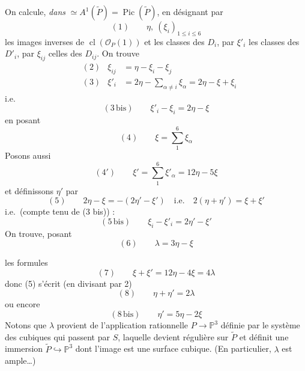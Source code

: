 \documentclass[11pt,a4paper]{article}
\begin{document}
On calcule, \emph{dans}  $\simeq A^1(\widetilde{P}) =
\operatorname{Pic}(\widetilde{P})$, en désignant par
\[
(1) \qquad \eta, \ (\xi_i)_{1 \leq i \leq 6}
\]
les images inverses de $\operatorname{cl}(\mathcal{O}_P(1))$ et les classes
des $D_i$, par $\xi'_i$ les classes des $D'_i$, par $\xi_{ij}$ celles des
$D_{ij}$. On trouve
\[
\begin{aligned}
&(2) & \xi_{ij} &= \eta - \xi_i - \xi_j \\
&(3) & \xi'_i &= 2\eta - \sum_{\alpha \neq i} \xi_\alpha = 2\eta - \xi + \xi_i
\end{aligned}
\]
i.e.
\[
(3\,\text{bis}) \qquad \xi'_i - \xi_i = 2\eta - \xi
\]
en posant
\[
(4) \qquad \xi = \sum_{1}^{6} \xi_\alpha
\]
Posons aussi
\[
(4') \qquad \xi' = \sum_{1}^{6} \xi'_\alpha = 12\eta - 5\xi
\]
et définissons $\eta'$ par
\[
(5) \qquad 2\eta - \xi = -(2\eta' - \xi') \quad \text{i.e.} \quad
2(\eta + \eta') = \xi + \xi'
\]
i.e.\ (compte tenu de (3 bis)) :
\[
(5\,\text{bis}) \qquad \xi_i - \xi'_i = 2\eta' - \xi'
\]
On trouve, posant
\[
(6) \qquad \lambda = 3\eta - \xi
\]

les formules
\[
(7) \qquad \xi + \xi' = 12\eta - 4\xi = 4\lambda
\]
donc (5) s'écrit (en divisant par 2) 
\[
(8) \qquad \eta + \eta' = 2\lambda
\]
ou encore
\[
(8\,\text{bis}) \qquad \eta' = 5\eta - 2\xi
\]
Notons que $\lambda$ provient de l'application rationnelle
$P \to \mathbb{P}^3$ définie par le système des cubiques qui passent par $S$,
laquelle devient régulière sur $\widetilde{P}$ et définit une immersion
$\widetilde{P} \hookrightarrow \mathbb{P}^3$ dont l'image est une surface
cubique. (En particulier, $\lambda$ est ample…) 
\end{document}
